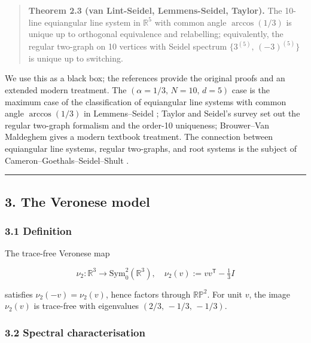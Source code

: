 \documentclass[
]{article}
\begin{document}
\begin{quote}
\textbf{Theorem 2.3 (van Lint-Seidel, Lemmens-Seidel, Taylor).} The
10-line equiangular line system in \(\mathbb{R}^5\) with common angle
\(\arccos(1/3)\) is unique up to orthogonal equivalence and relabelling;
equivalently, the regular two-graph on 10 vertices with Seidel spectrum
\(\{3^{(5)},\,(-3)^{(5)}\}\) is unique up to switching.
\end{quote}

We use this as a black box; the references \cite{vLS66,LS73,Tay77,Sei76,BvM22} provide the original proofs and an extended modern treatment.
The \((\alpha = 1/3,\, N = 10,\, d = 5)\) case is the maximum case of
the classification of equiangular line systems with common angle
\(\arccos(1/3)\) in Lemmens--Seidel \cite{LS73}; Taylor \cite{Tay77} and
Seidel's survey \cite{Sei76} set out the regular two-graph formalism and
the order-10 uniqueness; Brouwer--Van Maldeghem \cite{BvM22} gives a
modern textbook treatment. The connection between equiangular line
systems, regular two-graphs, and root systems is the subject of
Cameron--Goethals--Seidel--Shult \cite{CGSS76}.

\begin{center}\rule{0.5\linewidth}{0.5pt}\end{center}

\subsection{3. The Veronese model}\label{the-veronese-model}

\subsubsection{3.1 Definition}\label{definition}

The trace-free Veronese map

\[
\nu_2 : \mathbb{R}^3 \to \mathrm{Sym}^2_0(\mathbb{R}^3),\quad
  \nu_2(v) := v v^{\mathsf T} - \tfrac{1}{3}I
\]

satisfies \(\nu_2(-v) = \nu_2(v)\), hence factors through
\(\mathbb{RP}^2\). For unit \(v\), the image \(\nu_2(v)\) is trace-free
with eigenvalues \((2/3,\,-1/3,\,-1/3)\).

\subsubsection{3.2 Spectral
characterisation}\label{spectral-characterisation}
\end{document}
